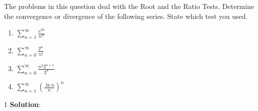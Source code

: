\documentclass[9pt]{article}
\def\solutions{1}
\begin{document}
\item The problems in this question deal with the Root and the Ratio Tests. Determine the convergence or divergence of the following series. State which test you used.

\begin{enumerate}
\item  $ \displaystyle \sum_{n=1}^{\infty} \frac{e^{2n}}{n^n} $
\item $ \displaystyle \sum_{n=0}^{\infty} \frac{2^n}{n!} $
\item $ \displaystyle \sum_{n=0}^{\infty} \frac{n^2  2^{n+1}}{3^n}  $
\item $ \displaystyle \sum_{n=1}^{\infty} \left ( \frac{\ln n}{n} \right )^n $
\end{enumerate}

\if\solutions1
\vspace{3mm}
{\bf Solution}: \\
\end{document}
